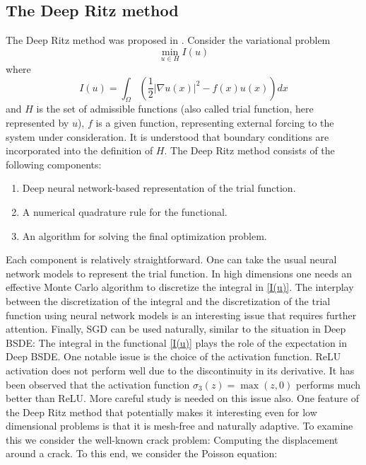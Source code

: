 \documentclass[12pt]{article}
\theoremstyle{definition}
\begin{document}
\subsection{The Deep Ritz method}
The Deep Ritz method was proposed in \cite{E2018deep}.
%
%
%
%
Consider the variational problem \cite{Evans2010partial}
\begin{equation}
\min_{u \in H} I(u)
\end{equation}
where
\begin{equation}
I(u) = \int_{\Omega} \left( \frac 12  |\nabla u(x)|^2 -  f(x) u(x) \right) dx
\label{I(u)}
\end{equation}
and $H$ is the set of admissible functions (also called
trial function, here represented by $u$),
$f$ is a given function, representing
external forcing to the system under consideration.
It is understood that boundary conditions are incorporated into the definition of $H$.
The Deep Ritz method consists of the following components:
\begin{enumerate}
\item Deep neural network-based representation of the trial function.
\item A numerical quadrature rule for the functional.
\item An algorithm for solving the final optimization problem.
\end{enumerate}
Each component is relatively straightforward. One can take the usual neural network
models to represent the trial function. 
In high dimensions one needs an effective 
 Monte Carlo algorithm to discretize the integral in \eqref{I(u)}.
The interplay between the discretization of the integral and the discretization of the trial
function using neural network models is an interesting issue that requires further attention.
Finally, SGD can be used naturally, similar to the situation in Deep BSDE: The integral
in the functional \eqref{I(u)} plays the role of the expectation in Deep BSDE.
One notable issue is the choice of the activation function. ReLU activation does not perform well
due to the discontinuity in its derivative.
It has been observed that the activation function $\sigma_3 (z) = \max (z, 0)$ performs
 much better than ReLU.  More careful study is needed on this issue also.
One feature of the Deep Ritz method that potentially makes it interesting even
for low dimensional problems is that it is mesh-free and naturally adaptive.
To examine this we consider the well-known crack problem: Computing the displacement 
around a crack.  To this end, we consider the Poisson equation:
\end{document}
